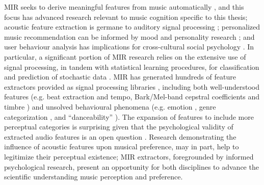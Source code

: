 \documentclass[a4paper]{article}
\begin{document}
MIR seeks to derive meaningful features from music automatically \cite{downie2003music}, and this focus has advanced research relevant to music cognition specific to this thesis; acoustic feature extraction \cite{lartillot2007matlab,bogdanov2013essentia} is germane to auditory signal processing \cite{toiviainen1998timbre,patel2003empirical}; personalized music recommendation \cite{shao2009music,li2007probabilistic} can be informed by mood and personality research \cite{forgas1995mood,rentfrow2003re,woolhouse2016generalizing}; and user behaviour analysis \cite{lee2004survey} has implications for cross-cultural social psychology \cite{peterson1996changing,woolhouse2013work}. In particular, a significant portion of MIR research relies on the extensive use of signal processing, in tandem with statistical learning procedures, for classification and prediction of stochastic data \cite{friedman2001elements}. MIR has generated hundreds of feature extractors provided as signal processing libraries \cite{lartillot2007matlab,porter2015acousticbrainz,bogdanov2013essentia}, including both well-understood features (e.g. beat extraction and tempo, Bark/Mel-band cepstral coefficients and timbre \cite{toiviainen1998timbre}) and unsolved behavioural phenomena (e.g. emotion \cite{lin2010eeg}, genre categorization \cite{tzanetakis2011music}, and ``danceability'' \cite{streich2005detrended}). The expansion of features to include more perceptual categories is surprising given that the psychological validity of extracted audio features is an open question \cite{aucouturier2012mel,friberg2014using,sturm2014state}. Research demonstrating the influence of acoustic features upon musical preference, may in part, help to legitimize their perceptual existence{\color{red};} MIR extractors, foregrounded by informed psychological research, present an opportunity for both disciplines to advance the scientific understanding music perception and preference. 
\end{document}
